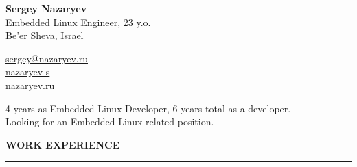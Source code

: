 \documentclass[hidelinks]{resume} %
\begin{document}
\begin{minipage}[t]{0.80\textwidth}
{\Huge \textbf{Sergey Nazaryev}}\vspace{2mm}\\
{Embedded Linux Engineer, 23 y.o.}\\
{Be'er Sheva, Israel \vspace{2mm}}\\

\end{minipage}
\begin{minipage}[t]{0.20\textwidth}
\vspace{-5mm}
{\small \faEnvelopeO} {\small \href{mailto:sergey@nazaryev.ru}{sergey@nazaryev.ru}}\\
{\small \faLinkedin} {\small \href{https://www.linkedin.com/in/nazaryev-s/}{nazaryev-s}}\\
{\small \faLink} {\small \href{https://nazaryev.ru}{nazaryev.ru}}
\end{minipage} \vspace{-7mm}

{\small
4 years as Embedded Linux Developer, 6 years total as a developer.\\
Looking for an Embedded Linux-related position.
}


\sectionskip
\MakeUppercase{\bf Work experience}
\sectionlineskip
\hrule
\end{document}
